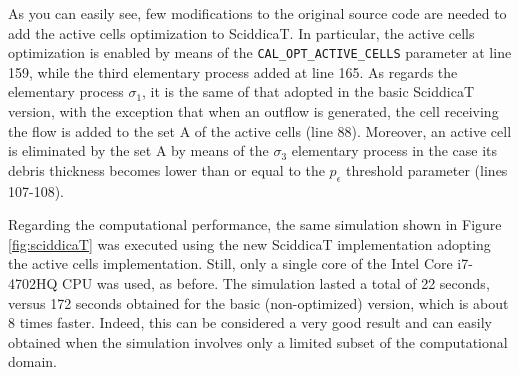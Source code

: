 
  




As you can easily see, few modifications to the original source code
are needed to add the active cells optimization to SciddicaT. In
particular, the active cells optimization is enabled by means of the
\verb'CAL_OPT_ACTIVE_CELLS' parameter at line 159, while the third
elementary process added at line 165. As regards the elementary
process $\sigma_1$, it is the same of that adopted in the basic SciddicaT
version, with the exception that when an outflow is generated, the
cell receiving the flow is added to the set A of the active cells
(line 88). Moreover, an active cell is eliminated by the set A by
means of the $\sigma_3$ elementary process in the case its debris
thickness becomes lower than or equal to the $p_\epsilon$ threshold
parameter (lines 107-108).

Regarding the computational performance, the same simulation shown in
Figure \ref{fig:sciddicaT} was executed using the new SciddicaT
implementation adopting the active cells implementation. Still, only a
single core of the Intel Core i7-4702HQ CPU was used, as before. The simulation lasted a total of 22 seconds, versus 172
seconds obtained for the basic (non-optimized) version, which is about
8 times faster. Indeed, this can be considered a very good result and can
easily obtained when the simulation involves only a limited subset of
the computational domain.

